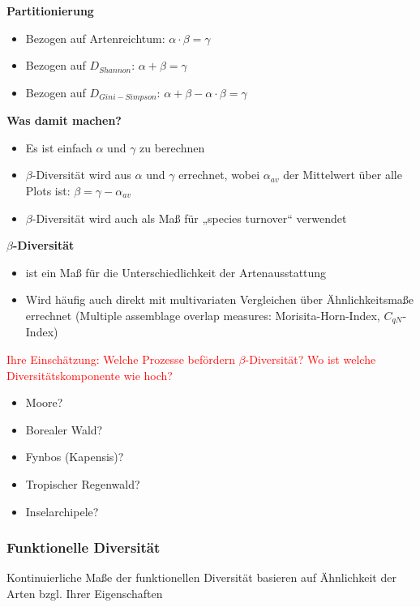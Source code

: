 \textbf{Partitionierung}
\begin{itemize}
	\item Bezogen auf Artenreichtum: $\alpha \cdot \beta = \gamma$
	\item Bezogen auf $D_{Shannon}$: $\alpha + \beta = \gamma$
	\item Bezogen auf $D_{Gini-Simpson}$: $\alpha + \beta - \alpha \cdot \beta = \gamma$
\end{itemize}

\textbf{Was damit machen?}
\begin{itemize}
	\item Es ist einfach $\alpha$ und $\gamma$ zu berechnen
	\item $\beta$-Diversität wird aus $\alpha$ und $\gamma$ errechnet, wobei $\alpha_{av}$ der Mittelwert über alle Plots ist: $\beta=\gamma-\alpha_{av}$
	\item $\beta$-Diversität wird auch als Maß für „species turnover“ verwendet
\end{itemize}

\newpage
\textbf{$\beta$-Diversität}
\begin{itemize}
	\item ist ein Maß für die Unterschiedlichkeit der Artenausstattung
	\item Wird häufig auch direkt mit multivariaten Vergleichen über Ähnlichkeitsmaße errechnet (Multiple assemblage overlap measures: Morisita-Horn-Index, $C_{qN}$-Index)
\end{itemize}

\textcolor{red}{Ihre Einschätzung: Welche Prozesse befördern $\beta$-Diversität? Wo ist welche Diversitätskomponente wie hoch?}
\begin{itemize}
	\item Moore?
	\item Borealer Wald?
	\item Fynbos (Kapensis)?
	\item Tropischer Regenwald?
	\item Inselarchipele?
\end{itemize}

\newpage
\subsubsection{Funktionelle Diversität}
Kontinuierliche Maße der funktionellen Diversität basieren auf Ähnlichkeit der Arten bzgl. Ihrer Eigenschaften

